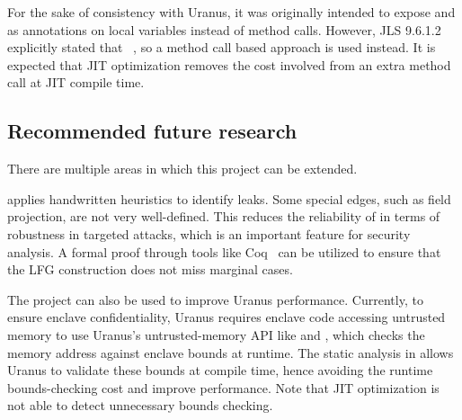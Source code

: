 For the sake of consistency with Uranus,
it was originally intended to expose  and 
as annotations on local variables instead of method calls.
However, \ac{JLS} 9.6.1.2 explicitly stated that
~\cite{jls},
so a method call based approach is used instead.
It is expected that JIT optimization removes the cost
involved from an extra method call at JIT compile time.

\subsection{Recommended future research}\label{subsec:recommended-future-research}
There are multiple areas in which this project can be extended.

\pname{} applies handwritten heuristics to identify leaks.
Some special edges, such as field projection, are not very well-defined.
This reduces the reliability of \pname{} in terms of robustness in targeted attacks,
which is an important feature for security analysis.
A formal proof through tools like Coq~\cite{coq}
can be utilized to ensure that the \ac{LFG} construction does not miss marginal cases.

The project can also be used to improve Uranus performance.
Currently, to ensure enclave confidentiality,
Uranus requires enclave code accessing untrusted memory to
use Uranus's untrusted-memory \ac{API}
like  and \cite{uranus},
which checks the memory address against enclave bounds at runtime.
The static analysis in \pname{} allows Uranus to validate these bounds at compile time,
hence avoiding the runtime bounds-checking cost and improve performance.
Note that JIT optimization is not able to detect unnecessary bounds checking.
